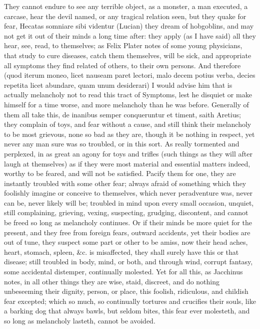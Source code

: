 {They cannot endure to see any terrible object, as a monster, a man
executed, a carcase, hear the devil named, or any tragical relation
seen, but they quake for fear, Hecatas somniare sibi videntur (Lucian)
they dream of hobgoblins, and may not get it out of their minds a long
time after: they apply (as I have said) all they hear, see, read, to
themselves; as Felix Plater notes of some young physicians, that
study to cure diseases, catch them themselves, will be sick, and
appropriate all symptoms they find related of others, to their own
persons. And therefore (quod iterum moneo, licet nauseam paret lectori,
malo decem potius verba, decies repetita licet abundare, quam unum
desiderari) I would advise him that is actually melancholy not to read
this tract of Symptoms, lest he disquiet or make himself for a time
worse, and more melancholy than he was before. Generally of them all
take this, de inanibus semper conqueruntur et timent, saith Aretius;
they complain of toys, and fear without a cause, and still think
their melancholy to be most grievous, none so bad as they are, though
it be nothing in respect, yet never any man sure was so troubled, or in
this sort. As really tormented and perplexed, in as great an agony for
toys and trifles (such things as they will after laugh at themselves)
as if they were most material and essential matters indeed, worthy to
be feared, and will not be satisfied. Pacify them for one, they are
instantly troubled with some other fear; always afraid of something
which they foolishly imagine or conceive to themselves, which never
peradventure was, never can be, never likely will be; troubled in mind
upon every small occasion, unquiet, still complaining, grieving,
vexing, suspecting, grudging, discontent, and cannot be freed so long
as melancholy continues. Or if their minds be more quiet for the
present, and they free from foreign fears, outward accidents, yet their
bodies are out of tune, they suspect some part or other to be amiss,
now their head aches, heart, stomach, spleen, \&c. is misaffected, they
shall surely have this or that disease; still troubled in body, mind,
or both, and through wind, corrupt fantasy, some accidental distemper,
continually molested. Yet for all this, as Jacchinus notes, in
all other things they are wise, staid, discreet, and do nothing
unbeseeming their dignity, person, or place, this foolish, ridiculous,
and childish fear excepted; which so much, so continually tortures and
crucifies their souls, like a barking dog that always bawls, but seldom
bites, this fear ever molesteth, and so long as melancholy lasteth,
cannot be avoided.

}
